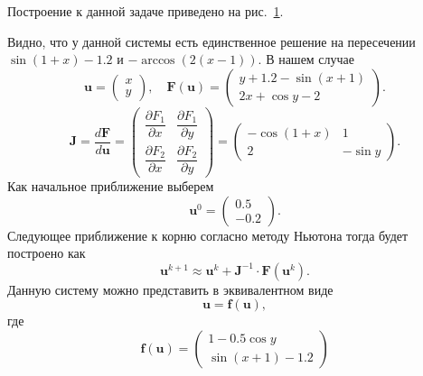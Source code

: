 \documentclass[a4paper]{article}
\begin{document}
\begin{sol}
Построение к данной задаче приведено на рис.~\ref{fig:4}.
\begin{figure}[]
	\centering
	\caption{}
	\label{fig:4}
\end{figure}
Видно, что у данной системы есть единственное решение на пересечении $\sin (1+x)-1.2$ и $-\arccos(2(x-1))$.
В нашем случае
\[
	\mathbf{u}= \begin{pmatrix} x\\y \end{pmatrix} ,\quad
	\mathbf{F}(\mathbf{u})=
	\begin{pmatrix} y+1.2-\sin(x+1)\\2x+\cos y -2 \end{pmatrix} 
.\] 
\[
	\mathbf{J}=	\frac{d\mathbf{F}}{d\mathbf{u}}= \begin{pmatrix} 
	\dfrac{\partial F_1}{\partial x} &
\dfrac{\partial F_1}{\partial y}\\
\dfrac{\partial F_2}{\partial x} &
\dfrac{\partial F_2}{\partial y} \end{pmatrix} 
=\begin{pmatrix} 
-\cos(1+x)& 1\\ 2& -\sin y\end{pmatrix} 
.\] 
Как начальное приближение выберем
\[
	\mathbf{u}^0= \begin{pmatrix} 0.5 \\-0.2 \end{pmatrix} 
.\] 
Следующее приближение к корню согласно методу Ньютона тогда
будет построено как
\[
	\mathbf{u}^{k+1}\approx \mathbf{u}^k +\mathbf{J}^{-1}\cdot
	\mathbf{F}\left( \mathbf{u}^k \right) 
.\]
Данную систему можно представить в эквивалентном виде
\[
	\mathbf{u}=\mathbf{f}(\mathbf{u})
,\]
где
\[
	\mathbf{f}(\mathbf{u})=\begin{pmatrix} 
	1- 0.5 \cos y\\ \sin (x+1)-1.2\end{pmatrix} 
\]
\end{sol}
\end{document}
